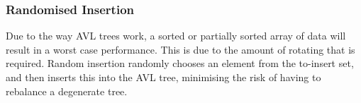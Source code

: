 \documentclass[14]{article}
\begin{document}
\subsubsection{Randomised Insertion}
Due to the way AVL trees work, a sorted or partially sorted array of data will result in a worst case performance.
This is due to the amount of rotating that is required. Random insertion randomly chooses an element from the to-insert 
set, and then inserts this into the AVL tree, minimising the risk of having to rebalance a degenerate tree.
\end{document}

